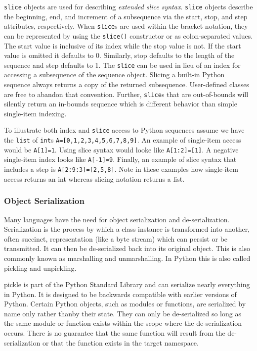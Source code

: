 \documentclass[preprint]{sigplanconf}
\begin{document}
\texttt{slice} objects are used for describing \emph{extended slice syntax}.
\texttt{slice} objects describe the beginning, end, and increment of a
subsequence via the start, stop, and step attributes, respectively. When
\texttt{slice}s are used within the bracket notation, they can be represented
by using the \texttt{slice()} constructor or as colon-separated values. The
start value is inclusive of its index while the stop value is not. If the
start value is omitted it defaults to 0. Similarly, stop defaults to the
length of the sequence and step defaults to 1. The \texttt{slice} can be used
in lieu of an index for accessing a subsequence of the sequence object.
Slicing a built-in Python sequence always returns a copy of the returned
subsequence. User-defined classes are free to abandon that convention.
Further, \texttt{slice}s that are out-of-bounds will silently return an
in-bounds sequence which is different behavior than simple single-item
indexing.

To illustrate both index and \texttt{slice} access to Python sequences assume
we have the \texttt{list} of \texttt{int}s \texttt{A=[0,1,2,3,4,5,6,7,8,9]}.
An example of single-item access would be \texttt{A[1]=1}. Using slice syntax
would looke like \texttt{A[1:2]=[1]}. A negative single-item index looks like
\texttt{A[-1]=9}.  Finally, an example of slice syntax that includes a step is
\texttt{A[2:9:3]=[2,5,8]}.  Note in these examples how single-item access
returns an int whereas slicing notation returns a list.

\subsubsection{Object Serialization}

Many languages have the need for object serialization and de-serialization.
Serialization is the process by which a class instance is transformed into
another, often succinct, representation (like a byte stream) which can
persist or be transmitted. It can then be de-serialized back into its original
object. This is also commonly known as marshalling and unmarshalling. In
Python this is also called pickling and unpickling.

pickle is part of the Python Standard Library \cite{Lun01} and can serialize
nearly everything in Python. It is designed to be backwards compatible with
earlier versions of Python. Certain Python objects, such as modules or
functions, are serialized by name only rather thanby their state. They can
only be de-serialized so long as the same module or function exists within the
scope where the de-serialization occurs. There is no guarantee that the same
function will result from the de-serialization or that the function exists in
the target namespace.
\end{document}
